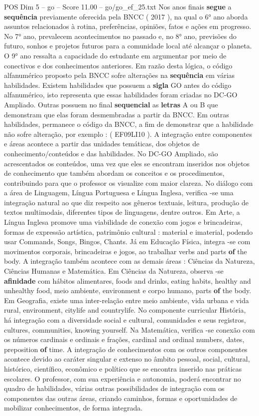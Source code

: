\begin{textsample}{POS Dim 5 – go – Score 11.00 – go/go\_ef\_25.txt}
Nos anos finais \textbf{segue} a \textbf{sequência} previamente oferecida pela BNCC ( 2017 ), na qual o 6{\EmojiFont °} ano aborda assuntos relacionados à rotina, preferências, opiniões, fatos e ações em progresso.
No 7{\EmojiFont °} ano, prevalecem acontecimentos no passado e, no 8{\EmojiFont °} ano, previsões do futuro, sonhos e projetos futuros para a comunidade local até alcançar o planeta.
O 9{\EmojiFont °} ano ressalta a capacidade do estudante em argumentar por meio de conectivos e dos conhecimentos anteriores.
Em razão desta lógica, o código alfanumérico proposto pela BNCC sofre alterações na \textbf{sequência} em várias habilidades.
Existem habilidades que possuem a \textbf{sigla} GO antes do código alfanumérico, isto representa que essas habilidades foram criadas no DC-GO Ampliado.
Outras possuem no final \textbf{sequencial} as \textbf{letras} A ou B que demonstram que elas foram desmembradas a partir da BNCC.
Em outras habilidades, permanece o código da BNCC, a fim de demonstrar que a habilidade não sofre alteração, por exemplo : ( EF09LI10 ).
A integração entre componentes e áreas acontece a partir das unidades temáticas, dos objetos de conhecimento/conteúdos e das habilidades.
No DC-GO Ampliado, são acrescentados os conteúdos, uma vez que eles se encontram inseridos nos objetos de conhecimento que também abordam os conceitos e os procedimentos, contribuindo para que o professor os visualize com maior clareza.
No diálogo com a área de Linguagem, Língua Portuguesa e Língua Inglesa, verifica -se uma integração natural ao que diz respeito aos gêneros textuais, leitura, produção de textos multimodais, diferentes tipos de linguagens, dentre outros.
Em Arte, a Língua Inglesa promove uma viabilidade de conexão com jogos e brincadeiras, formas de expressão artística, patrimônio cultural : material e imaterial, podendo usar Commands, Songs, Bingos, Chants.
Já em Educação Física, integra -se com movimentos corporais, brincadeiras e jogos, ao trabalhar verbs and parts \textbf{of} the body.
A integração também acontece com as demais áreas : Ciências da Natureza, Ciências Humanas e Matemática.
Em Ciências da Natureza, observa -se \textbf{afinidade} com hábitos alimentares, foods and drinks, eating habits, healthy and unhealthy food, meio ambiente, environment e corpo humano, parts \textbf{of} the body.
Em Geografia, existe uma inter-relação entre meio ambiente, vida urbana e vida rural, environment, citylife and countrylife.
No componente curricular História, há integração com a diversidade social e cultural, comunidades e seus registros, cultures, communities, knowing yourself.
Na Matemática, verifica -se conexão com os números cardinais e ordinais e frações, cardinal and ordinal numbers, dates, preposition \textbf{of} time.
A integração de conhecimentos com os outros componentes acontece devido ao caráter singular e extenso no âmbito pessoal, social, cultural, histórico, científico, econômico e político que se encontra inserido nas práticas escolares.
O professor, com sua experiência e autonomia, poderá encontrar no quadro de habilidades, várias outras possibilidades de integração com os componentes das outras áreas, criando caminhos, formas e oportunidades de mobilizar conhecimentos, de forma integrada.


\end{textsample}
